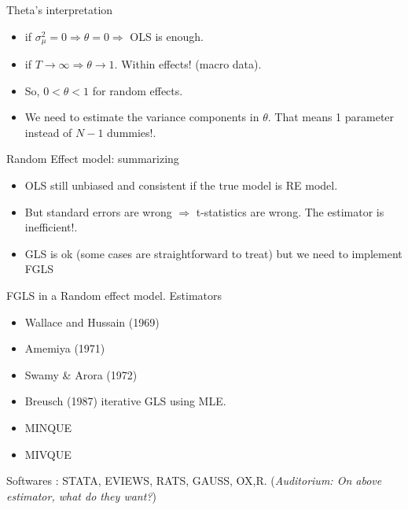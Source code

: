 \begin{frame}{Theta's interpretation}
	\begin{itemize}
		\item if $\sigma _{\mu }^{2}=0\Rightarrow \theta =0\Rightarrow $ OLS is enough. \pause
		\item if $T\rightarrow \infty \Rightarrow \theta \rightarrow 1.$ Within effects! (macro data). \pause
		\item So, $0<\theta <1$ for random effects. \pause
		\item We need to estimate the variance components in $\theta .$ That means 1 parameter instead of $N-1$ dummies!. \pause
	\end{itemize}
\end{frame}
\begin{frame}{Random Effect model: summarizing}
	\begin{itemize}
		\item OLS still unbiased and consistent if the true model is RE model.
		\item But standard errors are wrong $\Rightarrow $ t-statistics are wrong. The estimator is inefficient!.
		\item GLS is ok (some cases are straightforward to treat) but we need to implement FGLS
	\end{itemize}
\end{frame}
\begin{frame}{FGLS in a Random effect model.}
	Estimators
		\begin{itemize}
			\item Wallace and Hussain (1969)
			\item Amemiya (1971)
			\item Swamy \& Arora (1972)
			\item Breusch (1987) iterative GLS using MLE.
			\item MINQUE
			\item MIVQUE
		\end{itemize}
	Softwares : STATA, EVIEWS, RATS, GAUSS, OX,R. (\emph{Auditorium: On above estimator, what do they want?})
\end{frame}
